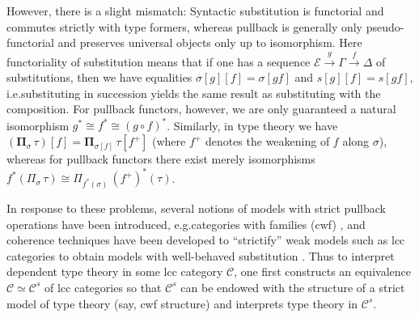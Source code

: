 \documentclass[a4paper]{article}
\theoremstyle{remark}
\theoremstyle{definition}
\begin{document}
However, there is a slight mismatch:
Syntactic substitution is functorial and commutes strictly with type formers, whereas pullback is generally only pseudo-functorial and preserves universal objects only up to isomorphism.
Here functoriality of substitution means that if one has a sequence $\mathcal{E} \xrightarrow{g} \Gamma \xrightarrow{f} \Delta$ of substitutions, then we have equalities $\sigma[g][f] = \sigma[gf]$ and $s[g][f] = s[gf]$, i.e.\@ substituting in succession yields the same result as substituting with the composition.
For pullback functors, however, we are only guaranteed a natural isomorphism $g^* \cong f^* \cong (g \circ f)^*$.
Similarly, in type theory we have $(\mathbf{\Pi}_\sigma \, \tau)[f] = \mathbf{\Pi}_{\sigma[f]} \, \tau[f^+]$ (where $f^+$ denotes the weakening of $f$ along $\sigma$), whereas for pullback functors there exist merely isomorphisms $f^*(\Pi_\sigma \, \tau) \cong \Pi_{f^*(\sigma)} \, (f^+)^*(\tau)$.

In response to these problems, several notions of models with strict pullback operations have been introduced, e.g.\@ categories with families (cwf) \cite{internal-type-theory}, and coherence techniques have been developed to ``strictify'' weak models such as lcc categories to obtain models with well-behaved substitution \cite{substitution-up-to-isomorphism,on-the-interpretation-of-type-theory-in-lcc-categories,the-local-universes-model}.
Thus to interpret dependent type theory in some lcc category $\mathcal{C}$, one first constructs an equivalence $\mathcal{C} \simeq \mathcal{C}^s$ of lcc categories so that $\mathcal{C}^s$ can be endowed with the structure of a strict model of type theory (say, cwf structure) and interprets type theory in $\mathcal{C}^s$.
\end{document}
